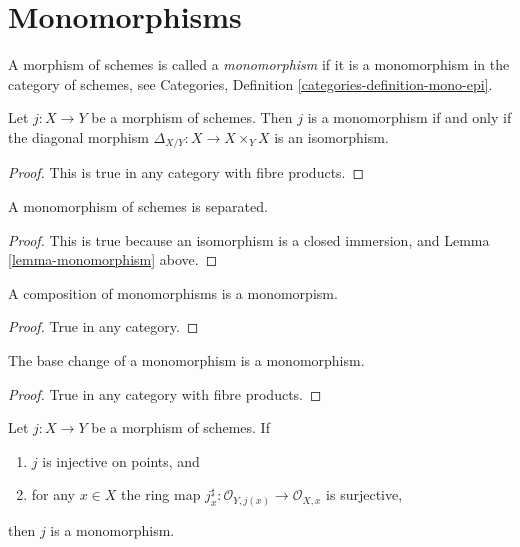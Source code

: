 \section{Monomorphisms}
\label{section-monomorphisms}

\begin{definition}
\label{definition-monomorphism}
A morphism of schemes is called a {\it monomorphism} if it is
a monomorphism in the category of schemes, see
Categories, Definition \ref{categories-definition-mono-epi}.
\end{definition}

\begin{lemma}
\label{lemma-monomorphism}
Let $j : X \to Y$ be a morphism of schemes.
Then $j$ is a monomorphism if and only if the
diagonal morphism $\Delta_{X/Y} : X \to X \times_Y X$ is
an isomorphism.
\end{lemma}

\begin{proof}
This is true in any category with fibre products.
\end{proof}

\begin{lemma}
\label{lemma-monomorphism-separated}
A monomorphism of schemes is separated.
\end{lemma}

\begin{proof}
This is true because an isomorphism is a closed immersion,
and Lemma \ref{lemma-monomorphism} above.
\end{proof}

\begin{lemma}
\label{lemma-composition-monomorphism}
A composition of monomorphisms is a monomorpism.
\end{lemma}

\begin{proof}
True in any category.
\end{proof}

\begin{lemma}
\label{lemma-base-change-monomorphism}
The base change of a monomorphism is a monomorphism.
\end{lemma}

\begin{proof}
True in any category with fibre products.
\end{proof}

\begin{lemma}
\label{lemma-injective-points-surjective-stalks}
Let $j : X \to Y$ be a morphism of schemes.
If
\begin{enumerate}
\item $j$ is injective on points, and
\item for any $x \in X$ the ring map
$j^\sharp_x : \mathcal{O}_{Y, j(x)} \to \mathcal{O}_{X, x}$
is surjective,
\end{enumerate}
then $j$ is a monomorphism.
\end{lemma}

